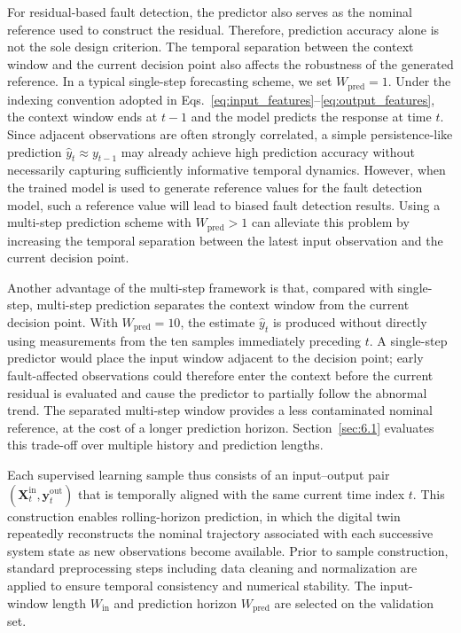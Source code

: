 \documentclass[a4paper,10pt]{cas-sc}%
\newcommand{\rev}[1]{#1}
\newcommand{\roundtworev}[1]{\textcolor{roundtwored}{#1}}
\newenvironment{revision}{}{}
\begin{document}
\begin{revision}
	\roundtworev{For residual-based fault detection, the predictor also serves as the nominal reference used to construct the residual. Therefore, prediction accuracy alone is not the sole design criterion. The temporal separation between the context window and the current decision point also affects the robustness of the generated reference.} In a typical single-step forecasting scheme, we set $W_{\mathrm{pred}}=1$.
	Under the indexing convention adopted in Eqs.~\ref{eq:input_features}--\ref{eq:output_features}, the context window ends at $t-1$ and the model predicts the response at time $t$.
	Since adjacent observations are often strongly correlated, a simple persistence-like prediction
	$\hat{y}_t \approx y_{t-1}$
	may already achieve high prediction accuracy without necessarily capturing sufficiently informative temporal dynamics. However, when the trained model is used to generate reference values for the fault detection model, such a reference value will lead to biased fault detection results. Using a multi-step prediction scheme with $W_{\mathrm{pred}} > 1$ can alleviate this problem by increasing the temporal separation between the latest input observation and the current decision point.

	Another advantage of the multi-step framework is that, compared with single-step, multi-step prediction separates the context window from the current decision point. With $W_{\mathrm{pred}}=10$, the estimate $\hat y_t$ is produced without directly using measurements from the ten samples immediately preceding $t$. A single-step predictor would place the input window adjacent to the decision point; early fault-affected observations could therefore enter the context before the current residual is evaluated and cause the predictor to partially follow the abnormal trend. The separated multi-step window provides a less contaminated nominal reference, at the cost of a longer prediction horizon. Section~\ref{sec:6.1} evaluates this trade-off over multiple history and prediction lengths.
\end{revision}

Each supervised learning sample thus consists of an input--output pair $(\boldsymbol{X}_t^{\mathrm{in}}, \boldsymbol{y}_t^{\mathrm{out}})$ that is temporally aligned with the same current time index $t$. This construction enables rolling-horizon prediction, in which the digital twin repeatedly reconstructs the nominal trajectory associated with each successive system state as new observations become available.
Prior to sample construction, standard preprocessing steps including data cleaning and normalization are applied to ensure temporal consistency and numerical stability. \rev{The input-window length $W_{\mathrm{in}}$ and prediction horizon $W_{\mathrm{pred}}$ are selected on the validation set.}
\end{document}
